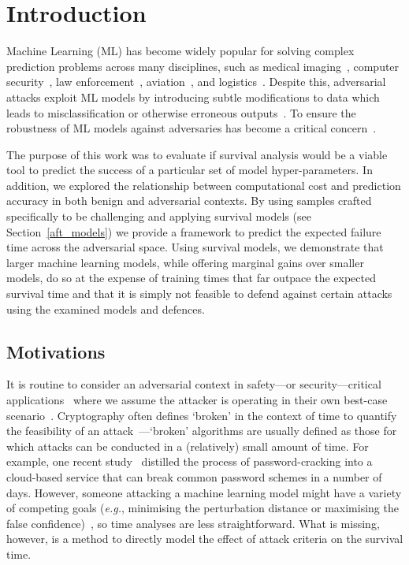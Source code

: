 \section{Introduction}

Machine Learning (ML) has become widely popular for solving complex prediction problems across many disciplines, such as medical imaging~\cite{ai_medical_imaging}, computer security~\cite{ai_security}, law enforcement~\cite{ai_prison}, aviation~\cite{ai_aviation}, and logistics~\cite{ai_luggage}. Despite this, adversarial attacks exploit ML models by introducing subtle modifications to data which leads to misclassification or otherwise erroneous outputs~\cite{chakraborty_adversarial_2018}. To ensure the robustness of ML models against adversaries has become a critical concern~\cite{adversarialpatch,carlini_towards_2017,croce_reliable_2020,hopskipjump,art2018,meyers}.

The purpose of this work was to evaluate if survival analysis would be a viable tool to predict the success of a particular set of model hyper-parameters. In addition, we explored the relationship between computational cost and prediction accuracy in both benign and adversarial contexts.  By using samples crafted specifically to be challenging and applying survival models (see Section~\ref{aft_models}) we provide a framework to predict the expected failure time across the adversarial space. Using survival models, we demonstrate that larger machine learning models, while offering marginal gains over smaller models, do so at the expense of training times that far outpace the expected survival time and that it is simply not feasible to defend against certain attacks using the examined models and defences.



\subsection{Motivations}

It is routine to consider an adversarial context in safety---or security---critical applications~\cite{ai_medical_imaging,ai_security,ai_prison,ai_aviation,ai_luggage} where we assume the attacker is operating in their own best-case scenario~\cite{leurent2020sha,kamal2017study,madry2017towards,pixelattack,deepfool,croce_reliable_2020}. Cryptography often defines `broken' in the context of time to quantify the feasibility of an attack~\cite{leurent2020sha}---`broken' algorithms are usually defined as those for which attacks can be conducted in a (relatively) small amount of time. For example, one recent study~\cite{kamal2017study} distilled the process of password-cracking into a cloud-based service that can break common password schemes in a number of days. However, someone attacking a machine learning model might have a variety of competing goals (\textit{e.g.}, minimising the perturbation distance or maximising the false confidence)~\cite{madry2017towards,hopskipjump,pixelattack,fgm,deepfool}, so time analyses are less straightforward. What is missing, however, is a method to directly model the effect of attack criteria on the survival time.

